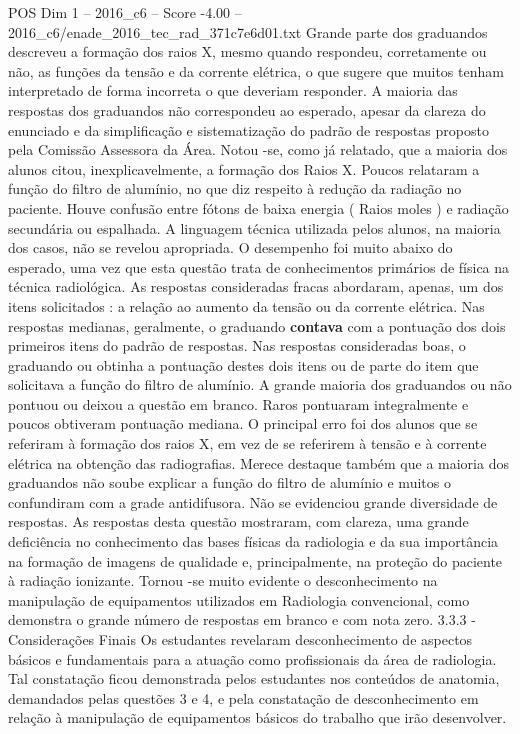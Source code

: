 \begin{textsample}{POS Dim 1 – 2016\_c6 – Score -4.00 – 2016\_c6/enade\_2016\_tec\_rad\_371c7e6d01.txt}
Grande parte dos graduandos descreveu a formação dos raios X, mesmo quando respondeu, corretamente ou não, as funções da tensão e da corrente elétrica, o que sugere que muitos tenham interpretado de forma incorreta o que deveriam responder.
A maioria das respostas dos graduandos não correspondeu ao esperado, apesar da clareza do enunciado e da simplificação e sistematização do padrão de respostas proposto pela Comissão Assessora da Área.
Notou -se, como já relatado, que a maioria dos alunos citou, inexplicavelmente, a formação dos Raios X.
Poucos relataram a função do filtro de alumínio, no que diz respeito à redução da radiação no paciente.
Houve confusão entre fótons de baixa energia ( Raios moles ) e radiação secundária ou espalhada.
A linguagem técnica utilizada pelos alunos, na maioria dos casos, não se revelou apropriada.
O desempenho foi muito abaixo do esperado, uma vez que esta questão trata de conhecimentos primários de física na técnica radiológica.
As respostas consideradas fracas abordaram, apenas, um dos itens solicitados : a relação ao aumento da tensão ou da corrente elétrica.
Nas respostas medianas, geralmente, o graduando \textbf{contava} com a pontuação dos dois primeiros itens do padrão de respostas.
Nas respostas consideradas boas, o graduando ou obtinha a pontuação destes dois itens ou de parte do item que solicitava a função do filtro de alumínio.
A grande maioria dos graduandos ou não pontuou ou deixou a questão em branco.
Raros pontuaram integralmente e poucos obtiveram pontuação mediana.
O principal erro foi dos alunos que se referiram à formação dos raios X, em vez de se referirem à tensão e à corrente elétrica na obtenção das radiografias.
Merece destaque também que a maioria dos graduandos não soube explicar a função do filtro de alumínio e muitos o confundiram com a grade antidifusora.
Não se evidenciou grande diversidade de respostas.
As respostas desta questão mostraram, com clareza, uma grande deficiência no conhecimento das bases físicas da radiologia e da sua importância na formação de imagens de qualidade e, principalmente, na proteção do paciente à radiação ionizante.
Tornou -se muito evidente o desconhecimento na manipulação de equipamentos utilizados em Radiologia convencional, como demonstra o grande número de respostas em branco e com nota zero. 3.3.3 - Considerações Finais Os estudantes revelaram desconhecimento de aspectos básicos e fundamentais para a atuação como profissionais da área de radiologia.
Tal constatação ficou demonstrada pelos estudantes nos conteúdos de anatomia, demandados pelas questões 3 e 4, e pela constatação de desconhecimento em relação à manipulação de equipamentos básicos do trabalho que irão desenvolver.

\end{textsample}
